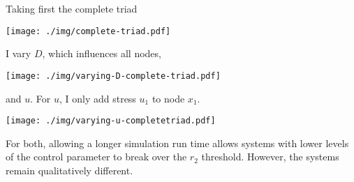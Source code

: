 \documentclass[11pt, letterpaper]{article}
\begin{document}
Taking first the complete triad

\texttt{[image: ./img/complete-triad.pdf]}

\noindent I vary $D$, which influences all nodes,

\texttt{[image: ./img/varying-D-complete-triad.pdf]}

\noindent and $u$. For $u$, I only add stress $u_1$ to node $x_1$.

\texttt{[image: ./img/varying-u-completetriad.pdf]}

For both, allowing a longer simulation run time allows systems with lower levels of the control parameter to break over the $r_2$ threshold. However, the systems remain qualitatively different.
\end{document}
